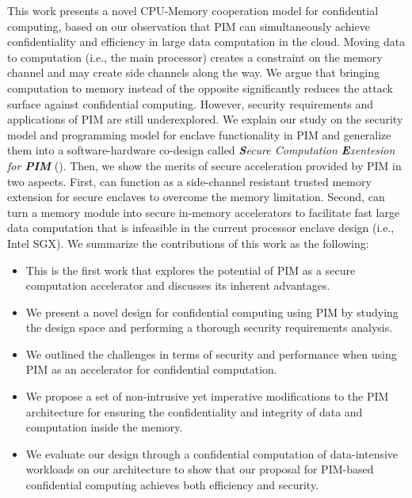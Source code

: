 This work presents a novel CPU-Memory cooperation model for confidential computing, based on our observation that PIM can simultaneously achieve confidentiality and efficiency in large data computation in the cloud. Moving data to computation (i.e., the main processor) creates a constraint on the memory channel and may create side channels along the way. We argue that bringing computation to memory instead of the opposite significantly reduces the attack surface against confidential computing. However, security requirements and applications of PIM are still underexplored. We explain our study on the security model and programming model for enclave functionality in PIM and generalize them into a software-hardware co-design called \emph{\textbf{S}ecure Computation \textbf{E}xentesion for \textbf{PIM}} (\thename). Then, we show the merits of secure acceleration provided by PIM in two aspects. First, \thename can function as a side-channel resistant trusted memory extension for secure enclaves to overcome the memory limitation. Second, \thename can turn a memory module into secure in-memory accelerators to facilitate fast large data computation that is infeasible in the current processor enclave design (i.e., Intel SGX). 
We summarize the contributions of this work as the following:

\begin{itemize}
\setlength\itemsep{1pt}
\item[-] This is the first work that explores the potential of PIM as a secure computation accelerator and discusses its inherent advantages.

\item[-] We present a novel design for confidential computing using PIM by studying the design space and performing a thorough security requirements analysis. 

\item[-] We outlined the challenges in terms of security and performance when using PIM as an accelerator for confidential computation. 
\item[-] We propose a set of non-intrusive yet imperative modifications to the PIM architecture for ensuring the confidentiality and integrity of data and computation inside the memory. 


\item[-] We evaluate our design through a confidential computation of data-intensive workloads on our architecture to show that our proposal for PIM-based confidential computing achieves both efficiency and security.

\end{itemize}

